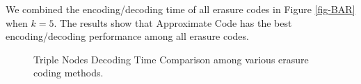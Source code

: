 \documentclass[sigconf]{acmart}
\begin{document}

We combined the encoding/decoding time of all erasure codes in Figure \ref{fig-BAR} when $k=5$. The results show that Approximate Code has the best encoding/decoding performance among all erasure codes. 

\begin{figure}[ht]
    \vspace{-0.3cm}
    \caption{Triple Nodes Decoding Time Comparison among various erasure coding methods.}\label{fig-decoding-3}
    \end{figure}
\end{document}
